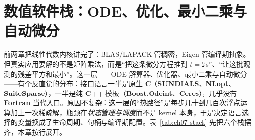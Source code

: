 \documentclass[12pt,a4paper,fontset=fandol]{ctexbook}
\newcommand{\Lib}[1]{\textbf{#1}}
\newcommand{\Lang}[1]{\textsf{\bfseries #1}}
\newcommand{\CL}{\Lang{C}}
\newcommand{\CPP}{\Lang{C++}}
\newcommand{\FTN}{\Lang{Fortran}}
\begin{document}
\chapter{数值软件栈：ODE、优化、最小二乘与自动微分}

前两章把线性代数内核讲完了：BLAS/LAPACK 管稠密，Eigen 管编译期抽象。但真实应用要解的不是矩阵乘法，而是``把这条微分方程推到 $t=2$\,s''、``让这批观测的残差平方和最小''。这一层——ODE 解算器、优化器、最小二乘与自动微分——有个反直觉的分布：接口语言一半是原生 \CL{}（\Lib{SUNDIALS}、\Lib{NLopt}、\Lib{SuiteSparse}），一半是纯 \CPP{} 模板（\Lib{Boost.Odeint}、\Lib{Ceres}），几乎没有 \FTN{} 当代入口。原因不复杂：这一层的``热路径''是每步几十到几百次浮点运算加上一次稀疏解，瓶颈在\emph{状态管理与调度}而不是 kernel 本身，于是决定语言选择的变量换成了生命周期、句柄与编译期配置。表~\ref{tab:ch07-stack} 先把六个栈摆齐，本章按行展开。
\end{document}
